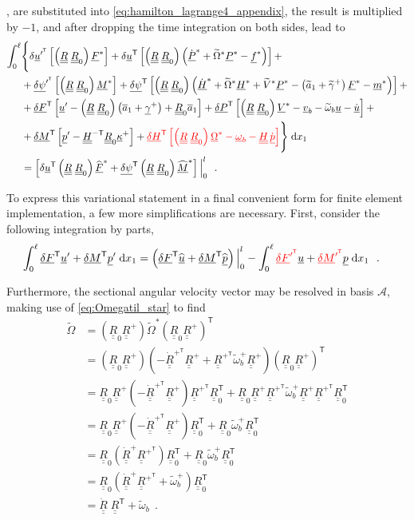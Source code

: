 \documentclass[12pt,a4paper,oneside,english]{abntex2} %
\newcommand{\fix}[1]{{\color{red}#1}}
\newcommand{\vect}[1]{\underline{#1}}
\newcommand{\uvec}[1]{\overline{#1}}
\def\tens#1{\underline{\underline{#1}}}
\def\til#1{\widetilde{#1}}
\def\lb{\left[}
\def\rb{\right]}
\def\lp{\left(}
\def\rp{\right)}
\def\T{\mathsf{T}}
\def\A{\mathcal{A}}
\def\xo{x_1}
\def\aone{\uvec{a}_1}
\def\aonetil{\til{a}_1}
\def\R{\tens{R}}
\def\RT{\R^\T}
\def\Rdot{\dot{\R}}
\def\Rp{\R^+}
\def\RpT{\R^{+^\T}}
\def\Rpdot{\dot{\R}^{+}}
\def\RpTdot{\dot{\R}^{+^\T}}
\def\Rz{\R_0}
\def\RzT{\R^\T_0}
\def\u{\vect{u}}
\def\uT{\u^\T}
\def\udot{\dot{\u}}
\def\uprime{\u^{\prime}}
\def\uprimeT{\u^{\prime^\T}}
\def\uhat{\widehat{\u}}
\def\vb{\vect{v}_b}
\def\om{\vect{\omega}_b}
\def\omtil{\til{\omega}_b}
\def\omtilp{\omtil^{+}}
\def\gam{\vect{\gamma}}
\def\gamp{\gam^{+}}
\def\gamptil{\til{\gamma}^{+}}
\def\kap{\vect{\kappa}}
\def\kapp{\kap^{+}}
\def\V{\vect{V}}
\def\Vs{\V^{*}}
\def\Vtils{\til{V}^{*}}
\def\Om{\vect{\Omega}}
\def\Oms{\Om^{*}}
\def\Omtil{\til{\Omega}}
\def\Omtils{\Omtil^{*}}
\def\P{\vect{P}}
\def\Ps{\P^*}
\def\Pdots{\dot{\P}^*}
\def\Hv{\vect{H}}
\def\Hvdot{\dot{\Hv}}
\def\Hvs{\Hv^*}
\def\Hvdots{\Hvdot^*}
\def\H{\tens{H}}
\def\HinvT{\H^{-\T}}
\def\p{\vect{p}}
\def\pprime{\p^{\prime}}
\def\pdot{\dot{\p}}
\def\phat{\widehat{\p}}
\def\F{\vect{F}}
\def\Fhat{\widehat{\F}}
\def\Fhats{\Fhat^*}
\def\Fs{\F^*}
\def\M{\vect{M}}
\def\Mhat{\widehat{\M}}
\def\Mhats{\Mhat^*}
\def\Ms{\M^*}
\def\f{\vect{f}}
\def\fs{\f^*}
\def\m{\vect{m}}
\def\ms{\m^*}
\def\delF{\vect{\delta F}}
\def\delFT{\delF^\T}
\def\delFpT{\delF^{\prime^\T}}
\def\delM{\vect{\delta M}}
\def\delMT{\delM^\T}
\def\delMpT{\delM^{\prime^\T}}
\def\delP{\vect{\delta P}}
\def\delPT{\delP^\T}
\def\delH{\vect{\delta H}}
\def\delHT{\delH^\T}
\def\delpsi{\vect{\delta\psi}}
\def\delpsiT{\delpsi^\T}
\def\delpsipT{\delpsi^{\prime^\T}}
\def\intl{\int_{0}^{\ell}}
\def\d{\textnormal{d}}
\def\RRz{\lp\R\;\Rz\rp}
\begin{document}
\begin{apendicesenv}
, are substituted into \cref{eq:hamilton_lagrange4_appendix}, \fix{the result is multiplied by $-1$,} and after dropping the time integration on both sides, lead to
\begin{align}
	\intl &\Biggl\{\Biggr. \delta\uprimeT\lb\RRz\Fs\rb + \delta\uT\lb\RRz\lp\Pdots+\Omtils\Ps-\fs\rp\rb +
	\nonumber \\
	&+\delpsipT\lb\RRz\Ms\rb + \delpsiT\lb\RRz\lp\Hvdots+\Omtils\Hvs+\Vtils\Ps-\lp\aonetil+\gamptil\rp\Fs-\ms\rp\rb + \nonumber \\
	&+\delFT\lb\uprime-\RRz\lp\aone+\gamp\rp+\Rz\aone\rb
	+\delPT\lb\RRz\Vs-\vb-\omtil\u-\udot\rb
	+ \nonumber \\
	&+\delMT\lb\pprime-\HinvT\Rz\kapp\rb
	+\fix{\delHT\lb\RRz\Oms-\om-\H\,\pdot\rb}
	\Biggl.\Biggr\}\;\d \xo
	\nonumber \\
	&= \lb \delta\uT\RRz\Fhats+\delpsiT\RRz\Mhats \rb \Big|_{0}^{l} \ \ .
    \label{eq:hamilton_lagrange5_appendix}
\end{align}

To express this variational statement in a final convenient form for finite element implementation, a few more simplifications are necessary. First, consider the following integration by parts,
\begin{align}
    \intl \delFT\uprime + \delMT\pprime \;\d\xo &= \lp \delFT\uhat + \delMT\phat \rp\Big|_{0}^{l}  - \intl \fix{\delFpT}\u + \fix{\delMpT}\p \;\d\xo \ \ .
    \label{eq:int_parts_Fu_Mpprime}
\end{align}

Furthermore, the sectional angular velocity vector may be resolved in basis $\A$, making use of \cref{eq:Omegatil_star} to find
\begin{align}
	\Omtil &= \lp\Rz\Rp\rp \Omtils \lp\Rz\Rp\rp^\T
	\nonumber \\
	&= \lp\Rz\Rp\rp \lp-\RpTdot\Rp + \RpT\omtilp\Rp\rp \lp\Rz\Rp\rp^\T
	\nonumber \\
	&= \Rz\Rp\lp-\RpTdot\Rp\rp\RpT\RzT + \Rz\Rp\RpT\omtilp\Rp\RpT\RzT
	\nonumber \\
	&= \Rz\Rp\lp-\RpTdot\Rp\rp\RzT + \Rz\omtilp\RzT
	\nonumber \\
	&= \Rz\lp\Rpdot\RpT\rp\RzT + \Rz\omtilp\RzT
	\nonumber \\
	&= \Rz\lp\Rpdot\RpT+\omtilp\rp\RzT
	\nonumber \\
 	&= \Rdot\;\RT + \omtil
	\ \ .
    \label{eq:Omtil}
\end{align}


\end{apendicesenv}
\end{document}
